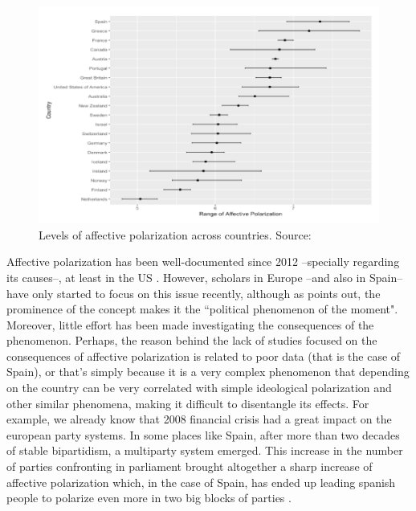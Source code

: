 \documentclass[a4paper, svgnames]{article}
\begin{document}
\begin{figure}
	\centering
	\includegraphics[scale=.7]{figure1.png}
	\caption{\label{fig:af-pol-comp} Levels of affective polarization across countries. Source: \cite{Gidron2018}}
\end{figure}

Affective polarization has been well-documented since 2012 --specially regarding its causes--, at least in the US \citep{Hetherington2015,Rogowski2016, Webster2017,Lelkes2018,Iyengar2019, Klein2020}. However, scholars in Europe --and also in Spain-- have only started to focus on this issue recently, although as \cite{Miller2019} points out, the prominence of the concept makes it the ``political phenomenon of the moment". Moreover, little effort has been made investigating the consequences of the phenomenon. Perhaps, the reason behind the lack of studies focused on the consequences of affective polarization is related to poor data (that is the case of Spain), or that's simply because it is a very complex phenomenon that depending on the country can be very correlated with simple ideological polarization and other similar phenomena, making it difficult to disentangle its effects. For example, we already know that 2008 financial crisis had a great impact on the european party systems. In some places like Spain, after more than two decades of stable bipartidism, a multiparty system emerged. This increase in the number of parties confronting in parliament brought altogether a sharp increase of affective polarization which, in the case of Spain, has ended up leading spanish people to polarize even more in two big blocks of parties \citep{Orriols2020}.
\end{document}
